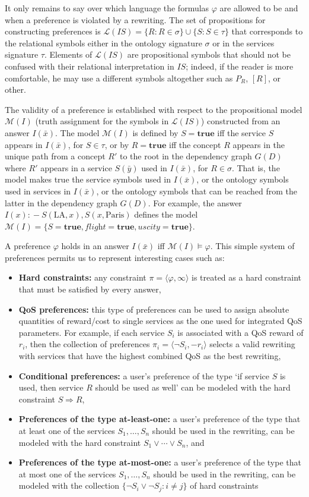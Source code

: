 \documentclass{llncs}
\newcommand{\tup}[1]{\langle #1 \rangle}
\newcommand{\qrule}{:\!\!-}
\renewcommand{\L}{\mathcal{L}}
\newcommand{\M}{\mathcal{M}}
\newcommand{\flight}{\textit{flight}}
\newcommand{\UScity}{\textit{uscity}}
\newcommand{\PA}{\text{Paris}}
\newcommand{\LA}{\text{LA}}
\begin{document}
It only remains to say over which language the formulas $\varphi$
are allowed to be and when a preference is violated by a rewriting.
The set of propositions for constructing preferences is
$\L(IS)=\{ R : R\in\sigma \} \cup \{S : S\in\tau \}$ that corresponds
to the relational symbols either in the ontology signature $\sigma$
or in the services signature $\tau$. Elements of $\L(IS)$ are
propositional symbols that should not be confused with their
relational interpretation in $IS$; indeed, if the reader
is more comfortable, he may use a different symbols altogether
such as $P_R$, $[R]$, or other.

The validity of a preference is established with respect to the
propositional model $\M(I)$ (truth assignment for the symbols in $\L(IS)$)
constructed from an answer $I(\bar x)$.
The model $\M(I)$ is defined by $S=\textbf{true}$ iff the service
$S$ appears in $I(\bar x)$, for $S\in\tau$, or by $R=\textbf{true}$
iff the concept $R$ appears in the unique path from a concept 
$R'$ to the root in the dependency graph $G(D)$ where $R'$ appears
in a service $S(\bar y)$ used in $I(\bar x)$, for $R\in\sigma$.
That is, the model makes true the service symbols used in
$I(\bar x)$, or the ontology symbols used in services in $I(\bar x)$,
or the ontology symbols that can be reached from the latter in
the dependency graph $G(D)$.
For example, the answer $I(x)\qrule S(\LA,x),S(x,\PA)$ defines
the model $\M(I)=\{S=\textbf{true},\flight=\textbf{true},\UScity=\textbf{true}\}$.

A preference $\varphi$ holds in an answer $I(\bar x)$ iff
$\M(I)\vDash\varphi$. This simple system of preferences permits
us to represent interesting cases such as:
\begin{itemize}
\item \textbf{Hard constraints:} any constraint $\pi=\tup{\varphi,\infty}$
is treated as a hard constraint that must be satisfied by every answer,
\item \textbf{QoS preferences:} this type of preferences can be used to
assign absolute quantities of reward/cost to single services as the one
used for integrated QoS parameters. For example, if each service $S_i$
is associated with a QoS reward of $r_i$, then the collection of preferences
$\pi_i=\tup{\neg S_i,-r_i}$ selects a valid rewriting with services that
have the highest combined QoS as the best rewriting,
\item \textbf{Conditional preferences:} a user's preference of the type
`if service $S$ is used, then service $R$ should be used as well' can be
modeled with the hard constraint $S \Rightarrow R$,
\item \textbf{Preferences of the type at-least-one:} a user's preference
of the type that at least one of the services $S_1,\ldots,S_n$ should be
used in the rewriting, can be modeled with the hard constraint $S_1\lor\cdots\lor S_n$, and
\item \textbf{Preferences of the type at-most-one:} a user's preference
of the type that at most one of the services $S_1,\ldots,S_n$ should be
used in the rewriting, can be modeled with the collection
$\{\neg S_i\lor\neg S_j: i\neq j\}$ of hard constraints
\end{itemize}
\end{document}

